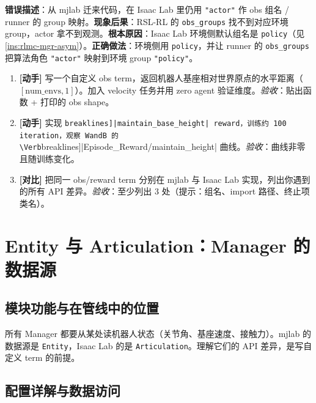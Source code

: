 \begin{pitfall}
\textbf{错误描述}：从 mjlab 迁来代码，在 Isaac Lab 里仍用 \verb|"actor"| 作 obs 组名 / runner 的 group 映射。\textbf{现象后果}：RSL-RL 的 \verb|obs_groups| 找不到对应环境 group，actor 拿不到观测。\textbf{根本原因}：Isaac Lab 环境侧默认组名是 \verb|policy|（见 \cref{ins:rlmc-mgr-asym}）。\textbf{正确做法}：环境侧用 \verb|policy|，并让 runner 的 \verb|obs_groups| 把算法角色 \verb|"actor"| 映射到环境 group \verb|"policy"|。
\end{pitfall}

\begin{practice}[本节练习]
\begin{enumerate}
  \item \textbf{[动手]} 写一个自定义 obs term，返回机器人基座相对世界原点的水平距离（$[\text{num\_envs},1]$）。加入 velocity 任务并用 zero agent 验证维度。\emph{验收}：贴出函数 + 打印的 obs shape。
  \item \textbf{[动手]} 实现 \Verb[breaklines]|maintain_base_height| reward，训练约 100 iteration，观察 WandB 的 \Verb[breaklines]|Episode_Reward/maintain_height| 曲线。\emph{验收}：曲线非零且随训练变化。
  \item \textbf{[对比]} 把同一 obs/reward term 分别在 mjlab 与 Isaac Lab 实现，列出你遇到的所有 API 差异。\emph{验收}：至少列出 3 处（提示：组名、import 路径、终止项类名）。
\end{enumerate}
\end{practice}

\section{Entity 与 Articulation：Manager 的数据源}
\label{sec:rlmc-mgr-entity}

\subsection{模块功能与在管线中的位置}

所有 Manager 都要从某处读机器人状态（关节角、基座速度、接触力）。mjlab 的数据源是 \verb|Entity|，Isaac Lab 的是 \verb|Articulation|。理解它们的 API 差异，是写自定义 term 的前提。

\subsection{配置详解与数据访问}

